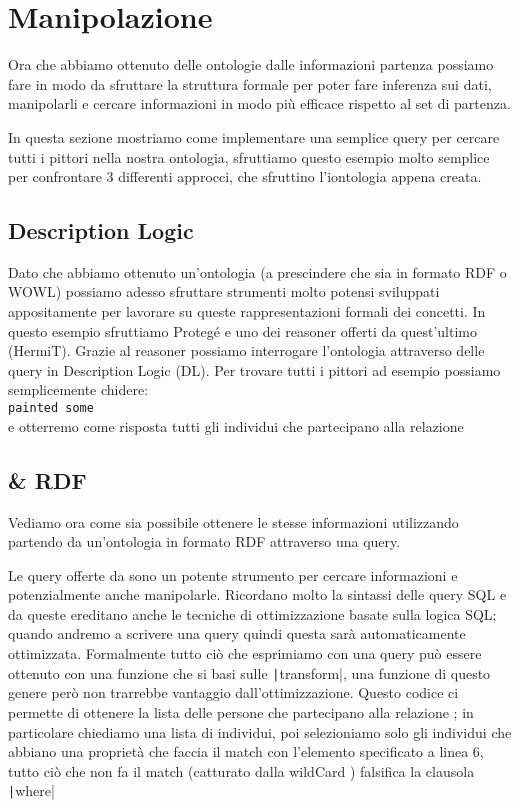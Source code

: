 \section{Manipolazione}
	Ora che abbiamo ottenuto delle ontologie dalle informazioni partenza possiamo fare in modo da sfruttare la struttura formale per poter fare inferenza sui dati, manipolarli e cercare informazioni in modo più efficace rispetto al set di partenza.
	
	In questa sezione mostriamo come implementare una semplice query per cercare tutti i pittori nella nostra ontologia, sfruttiamo questo esempio molto semplice per confrontare 3 differenti approcci, che sfruttino l'iontologia appena creata.
	\subsection{Description Logic}
		Dato che abbiamo ottenuto un'ontologia (a prescindere che sia in formato RDF o WOWL) possiamo adesso sfruttare strumenti molto potensi sviluppati appositamente per lavorare su queste rappresentazioni formali dei concetti. In questo esempio sfruttiamo Protegé e uno dei reasoner offerti da quest'ultimo (HermiT). Grazie al reasoner possiamo interrogare l'ontologia attraverso delle query in Description Logic (DL). Per trovare tutti i pittori ad esempio possiamo semplicemente chidere:\\
		\texttt{painted \color{purple}some\color{black}}\\
		e otterremo come risposta tutti gli individui che partecipano alla relazione 
	\subsection{\cduce \& RDF}
		Vediamo ora come sia possibile ottenere le stesse informazioni utilizzando \cduce  partendo da un'ontologia in formato RDF attraverso una query. 
		
		Le query offerte da \cduce sono un potente strumento per cercare informazioni e potenzialmente anche manipolarle. Ricordano molto la sintassi delle query SQL e da queste ereditano anche le tecniche di ottimizzazione basate sulla logica SQL; quando andremo a scrivere una query quindi questa sarà automaticamente ottimizzata. Formalmente tutto ciò che esprimiamo con una query può essere ottenuto con una funzione che si basi sulle \texttt|transform|, una funzione di questo genere però non trarrebbe vantaggio dall'ottimizzazione.
		Questo codice ci permette di ottenere la lista delle persone che partecipano alla relazione ; in particolare chiediamo una lista di individui, poi selezioniamo solo gli individui che abbiano una proprietà che faccia il match con l'elemento specificato a linea 6, tutto ciò che non fa il match (catturato dalla wildCard \say{\_}) falsifica la clausola \texttt|where|
		
